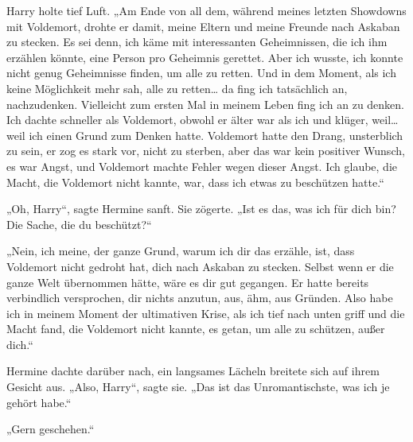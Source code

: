 Harry holte tief Luft.
„Am Ende von all dem, während meines letzten Showdowns mit Voldemort, drohte er damit, meine Eltern und meine Freunde nach Askaban zu stecken. Es sei denn, ich käme mit interessanten Geheimnissen, die ich ihm erzählen könnte, eine Person pro Geheimnis gerettet. Aber ich wusste, ich konnte nicht genug Geheimnisse finden, um alle zu retten. Und in dem Moment, als ich keine Möglichkeit mehr sah, alle zu retten… da fing ich tatsächlich an, nachzudenken. Vielleicht zum ersten Mal in meinem Leben fing ich an zu denken. Ich dachte schneller als Voldemort, obwohl er älter war als ich und klüger, weil… weil ich einen Grund zum Denken hatte. Voldemort hatte den Drang, unsterblich zu sein, er zog es stark vor, nicht zu sterben, aber das war kein positiver Wunsch, es war Angst, und Voldemort machte Fehler wegen dieser Angst. Ich glaube, die Macht, die Voldemort nicht kannte, war, dass ich etwas zu beschützen hatte.“

„Oh, Harry“, sagte Hermine sanft.
Sie zögerte.
„Ist es das, was ich für dich bin? Die Sache, die du beschützt?“

„Nein, ich meine, der ganze Grund, warum ich dir das erzähle, ist, dass Voldemort nicht gedroht hat, dich nach Askaban zu stecken. Selbst wenn er die ganze Welt übernommen hätte, wäre es dir gut gegangen. Er hatte bereits verbindlich versprochen, dir nichts anzutun, aus, ähm, aus Gründen. Also habe ich in meinem Moment der ultimativen Krise, als ich tief nach unten griff und die Macht fand, die Voldemort nicht kannte, es getan, um alle zu schützen, außer dich.“

Hermine dachte darüber nach, ein langsames Lächeln breitete sich auf ihrem Gesicht aus. „Also, Harry“, sagte sie. „Das ist das Unromantischste, was ich je gehört habe.“

„Gern geschehen.“

